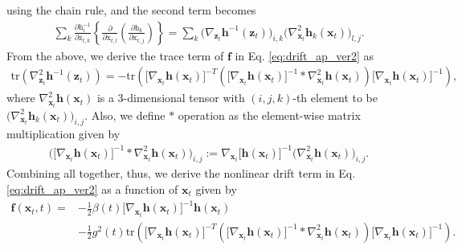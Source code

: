 \documentclass{article}
\theoremstyle{definition}
\theoremstyle{remark}
\begin{document}
	using the chain rule, and the second term becomes
	\begin{align*}
	\sum_{k}\frac{\partial \mathrm{h}^{-1}_{i}}{\partial \mathrm{z}_{t,k}} \left \{  \frac{\partial}{\partial \mathrm{x}_{t,l}} \left (\frac{\partial \mathrm{h}_{k}}{\partial \mathrm{x}_{t,j}} \right ) \right \} =  \sum_{k} \big(\nabla_{\mathbf{z}_{t}} \mathbf{h}^{-1}(\mathbf{z}_{t})\big)_{i,k} \big(\nabla_{\mathbf{x}_{t}}^{2} \mathbf{h}_{k}(\mathbf{x}_{t})\big)_{l,j}.
	\end{align*}
	From the above, we derive the trace term of $\mathbf{f}$ in Eq. \eqref{eq:drift_ap_ver2} as
	\begin{align*}
	\text{tr} \left ( \nabla_{\mathbf{z}_{t}}^{2} \mathbf{h}^{-1}(\mathbf{z}_{t})    \right ) = - \text{tr}  \left (  \big[ \nabla_{\mathbf{x}_{t}}\mathbf{h}(\mathbf{x}_{t})\big]^{-T} \left ( \big[\nabla_{\mathbf{x}_{t}}\mathbf{h}(\mathbf{x}_{t})\big]^{-1} * \nabla_{\mathbf{x}_{t}}^{2}\mathbf{h}(\mathbf{x}_{t})  \right )  \big[ \nabla_{\mathbf{x}_{t}}\mathbf{h}(\mathbf{x}_{t})\big]^{-1} \right ),
	\end{align*}
	where $\nabla_{\mathbf{x}_{t}}^{2}\mathbf{h}(\mathbf{x}_{t})$ is a 3-dimensional tensor with $(i,j,k)$-th element to be $\big(\nabla_{\mathbf{x}_{t}}^{2}\mathbf{h}_{k}(\mathbf{x}_{t})\big)_{i,j}$. Also, we define $*$ operation as the element-wise matrix multiplication given by
	\begin{align*}
	\Big(\big[\nabla_{\mathbf{x}_{t}}\mathbf{h}(\mathbf{x}_{t})\big]^{-1} * \nabla_{\mathbf{x}_{t}}^{2}\mathbf{h}(\mathbf{x}_{t})\Big)_{i,j}:=\nabla_{\mathbf{x}_{t}}\big[\mathbf{h}(\mathbf{x}_{t})\big]^{-1}\Big(\nabla_{\mathbf{x}_{t}}^{2}\mathbf{h}(\mathbf{x}_{t})\Big)_{i,j}.
	\end{align*}
	Combining all together, thus, we derive the nonlinear drift term in Eq. \eqref{eq:drift_ap_ver2} as a function of $\mathbf{x}_{t}$ given by
	\begin{align*}
	\mathbf{f}(\mathbf{x}_{t},t)=&-\frac{1}{2} \beta(t) \big[\nabla_{\mathbf{x}_{t}}\mathbf{h}(\mathbf{x}_{t})\big]^{-1} \mathbf{h}(\mathbf{x}_{t})\\
	& - \frac{1}{2} g^{2}(t) \text{tr}  \left (  \big[ \nabla_{\mathbf{x}_{t}}\mathbf{h}(\mathbf{x}_{t})\big]^{-T} \left ( \big[\nabla_{\mathbf{x}_{t}}\mathbf{h}(\mathbf{x}_{t})\big]^{-1} * \nabla_{\mathbf{x}_{t}}^{2}\mathbf{h}(\mathbf{x}_{t})  \right )  \big[ \nabla_{\mathbf{x}_{t}}\mathbf{h}(\mathbf{x}_{t})\big]^{-1} \right ).
	\end{align*}		
	
\end{document}
